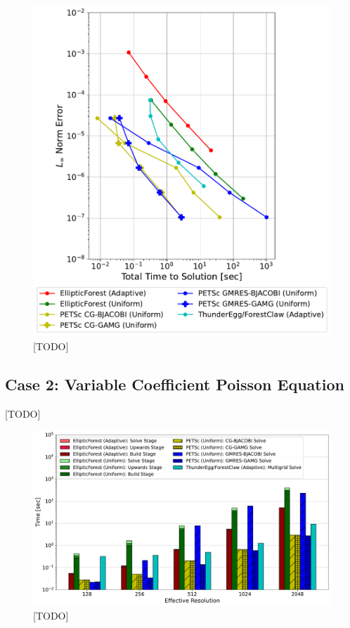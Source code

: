 \begin{figure}
    \centering
    \includegraphics[width=1.0\textwidth, clip=true, trim={40 20 80 50}]{figures/case01-work-precision-plots-no-title.pdf}
    \caption{[TODO]}
    \label{fig:case01-work-precision-plot}
\end{figure}

\subsection{Case 2: Variable Coefficient Poisson Equation}

[TODO]

\begin{figure}
    \centering
    \includegraphics[width=1.0\textwidth, clip=true, trim={60 20 100 60}]{figures/case02-stacked-bar-plot-comparisons-no-title.pdf}
    \caption{[TODO]}
    \label{fig:case02-stacked-bar-plot}
\end{figure}

